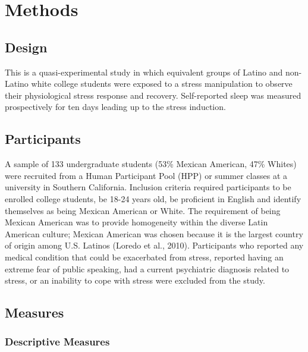 \documentclass[man, fleqn, noextraspace]{apa6}
\begin{document}
\hypertarget{methods}{%
\section{Methods}\label{methods}}

\hypertarget{design}{%
\subsection{Design}\label{design}}

This is a quasi-experimental study in which equivalent groups of Latino and non-Latino white college students were exposed to a stress manipulation to observe their physiological stress response and recovery. Self-reported sleep was measured prospectively for ten days leading up to the stress induction.

\hypertarget{participants}{%
\subsection{Participants}\label{participants}}

A sample of 133 undergraduate students (53\% Mexican American, 47\% Whites) were recruited from a Human Participant Pool (HPP) or summer classes at a university in Southern California. Inclusion criteria required participants to be enrolled college students, be 18-24 years old, be proficient in English and identify themselves as being Mexican American or White. The requirement of being Mexican American was to provide homogeneity within the diverse Latin American culture; Mexican American was chosen because it is the largest country of origin among U.S. Latinos (Loredo et al., 2010). Participants who reported any medical condition that could be exacerbated from stress, reported having an extreme fear of public speaking, had a current psychiatric diagnosis related to stress, or an inability to cope with stress were excluded from the study.

\hypertarget{measures}{%
\subsection{Measures}\label{measures}}

\hypertarget{descriptive-measures}{%
\subsubsection{Descriptive Measures}\label{descriptive-measures}}
\end{document}
